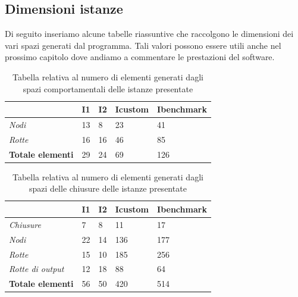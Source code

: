 \subsection{Dimensioni istanze}
Di seguito inseriamo alcune tabelle riassuntive che raccolgono le dimensioni dei vari spazi generati dal programma. Tali valori possono essere utili anche nel prossimo capitolo dove andiamo a commentare le prestazioni del software.

\begin{table}[h]
    \centering
    \begin{tabular}{ l | l l l l}
        & I1 & I2 & Icustom & \textbf{Ibenchmark}\\
        \hline
        \rowcolor{yellow} \emph{Nodi} & 13 & 8 & 23 & 41 \\
        \emph{Rotte}& 16 & 16 & 46 & 85 \\
        \hline
        \rowcolor{mygray} \textbf{Totale elementi} & 29 & 24 & 69 & 126 \\
        
    \end{tabular}
    \caption{Tabella relativa al numero di elementi generati dagli spazi comportamentali delle istanze presentate}
    \label{tab:tabella-behavior}
\end{table}

\begin{table}[h]
    \centering
    \begin{tabular}{ l | l l l l}
        & I1 & I2 & Icustom & \textbf{Ibenchmark}\\
        \hline
        \emph{Chiusure}  & 7 & 8 & 11 & 17\\
        \rowcolor{yellow} \emph{Nodi} & 22 & 14 & 136 & 177 \\
        \emph{Rotte} & 15 & 10 & 185 & 256 \\
        \emph{Rotte di output} & 12 & 18 & 88 & 64\\
        \hline
        \rowcolor{mygray} \textbf{Totale elementi} & 56 & 50 & 420 & 514 \\
        
    \end{tabular}
    \caption{Tabella relativa al numero di elementi generati dagli spazi delle chiusure delle istanze presentate}
    \label{tab:tabella-closures}
\end{table}
